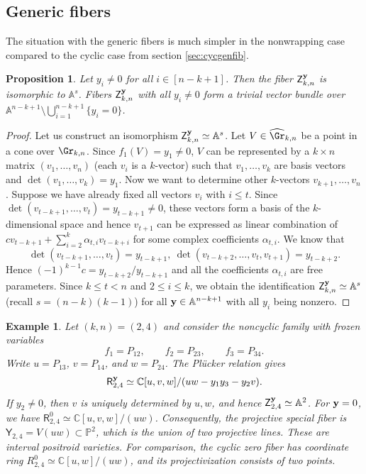 \documentclass[11pt]{amsart}
\numberwithin{equation}{section}
\newtheorem{prop}[thm]{Proposition}
\newtheorem{example}[thm]{Example}
\newcommand{\bC}{{\mathbb C}}
\newcommand{\bP}{{\mathbb P}}
\newcommand{\bA}{{\mathbb A}}
\newcommand{\bfy}{{\bf y}}
\begin{document}
\subsection{Generic fibers}
The situation with the generic fibers is much simpler in the nonwrapping case compared
to the cyclic case from section \ref{sec:cycgenfib}. 
\begin{prop}
Let $y_i\ne 0$ for all $i\in [n-k+1]$. Then the fiber ${\mathsf Z}_{k,n}^\bfy$ is isomorphic 
to $\bA^s$. Fibers ${\mathsf Z}_{k,n}^\bfy$ with all $y_i\ne 0$ form a  trivial vector
bundle over $\bA^{n-k+1} \setminus \bigcup_{i=1}^{n-k+1}\{y_i=0\}$.
\end{prop}
\begin{proof}
Let us construct an isomorphism ${\mathsf Z}_{k,n}^\bfy\simeq \bA^s$. 
Let $V\in \widehat{\Gr}_{k,n}$ be a point in a cone over $\Gr_{k,n}$. Since $f_1(V)=y_1\ne 0$,
$V$ can be represented by a $k\times n$ matrix $(v_1,\dots,v_n)$ (each $v_i$ is a 
$k$-vector) such that $v_1, \dots,v_k$ are basis vectors and 
$\det(v_1,\dots,v_k)=y_1$. Now we want to determine other $k$-vectors $v_{k+1},\dots,v_n$.
Suppose we have already fixed all vectors $v_i$ with $i\le t$. Since 
$\det(v_{t-k+1},\dots,v_t)=y_{t-k+1}\ne 0$, these vectors form a basis of the 
$k$-dimensional space and hence $v_{t+1}$ can be expressed as linear combination
of $cv_{t-k+1}+\sum_{i=2}^k \alpha_{t,i} v_{t-k+i}$ for some complex coefficients 
$\alpha_{t,i}$. We know that 
\[
\det(v_{t-k+1},\dots,v_t)=y_{t-k+1},\ \det(v_{t-k+2},\dots,v_t,v_{t+1})=y_{t-k+2}.
\]
Hence $(-1)^{k-1}c=y_{t-k+2}/y_{t-k+1}$ and all the coefficients $\alpha_{t,i}$ are 
free parameters. Since $k\le t <n$ and $2\le i\le k$, we obtain the identification 
${\mathsf Z}_{k,n}^\bfy\simeq \bA^s$ (recall $s=(n-k)(k-1)$)
for all $\bfy\in\bA^{n-k+1}$ with all $y_i$ being nonzero.
\end{proof}


\begin{example}
Let $(k,n)=(2,4)$ and consider the noncyclic
family with frozen variables
\[
f_1=P_{12},\qquad f_2=P_{23},\qquad
f_3=P_{34}.
\]
Write $u=P_{13}$, $v=P_{14}$, and $w=P_{24}$.
The Pl\"ucker relation gives
\[
{\mathsf R}_{2,4}^{\bfy}
\simeq
\bC[u,v,w]/(uw-y_1y_3-y_2v).
\]
If $y_2\ne0$, then $v$ is uniquely determined
by $u,w$, and hence
${\mathsf Z}_{2,4}^{\bfy}\simeq\bA^2$.
For $\bfy=0$, we have
${\mathsf R}_{2,4}^{0}
\simeq\bC[u,v,w]/(uw)$.
Consequently, the projective special fiber is
${\mathsf Y}_{2,4}
=V(uw)\subset\bP^2$,
which is the union of two projective lines.
These are interval positroid varieties.
For comparison, the cyclic zero fiber has
coordinate ring
$R_{2,4}^{0}\simeq\bC[u,w]/(uw)$,
and its projectivization consists of two points.
\end{example}
\end{document}
